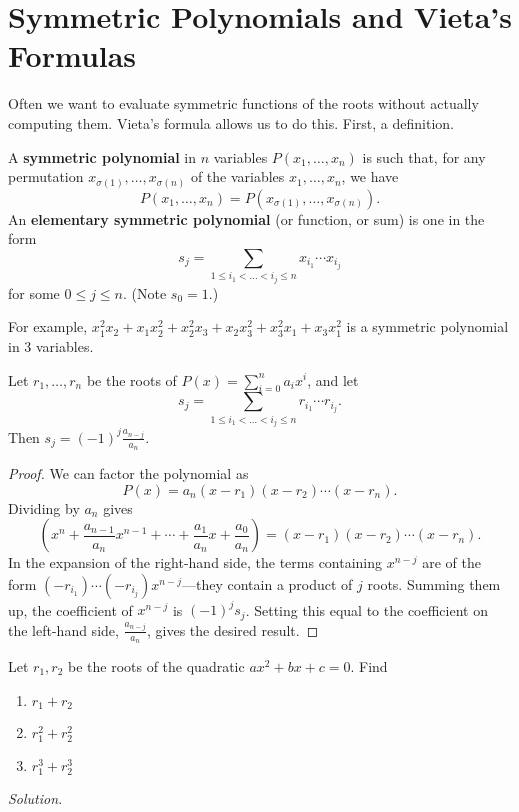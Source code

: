 \section{Symmetric Polynomials and Vieta's Formulas}
Often we want to evaluate symmetric functions of the roots without actually computing them. Vieta's formula allows us to do this. First, a definition.
\begin{df}
A \textbf{symmetric polynomial} in $n$ variables $P(x_1,\ldots, x_n)$ is such that, for any permutation $x_{\sigma(1)},\ldots, x_{\sigma(n)}$ of the variables $x_1,\ldots, x_n$, we have
\[P(x_1,\ldots, x_n)=P(x_{\sigma(1)},\ldots, x_{\sigma(n)}).\]
An \textbf{elementary symmetric polynomial} (or function, or sum) is one in the form
\[
s_j=\sum_{1\leq i_1<\ldots<i_j\leq n}x_{i_1}\cdots x_{i_j}
\]
for some $0\leq j\leq n$. (Note $s_0=1$.)
\end{df}
For example, $x_1^2x_2+x_1x_2^2+x_2^2x_3+x_2x_3^2+x_3^2x_1+x_3x_1^2$ is a symmetric polynomial in 3 variables.
\begin{thm}
Let $r_1,\ldots, r_n$ be the roots of $P(x)=\sum_{i=0}^n a_ix^i$, and let \[s_j=\sum_{1\leq i_1<\ldots<i_j\leq n}r_{i_1}\cdots r_{i_j}.\]  
Then $s_j=(-1)^j\frac{a_{n-j}}{a_n}$.
\end{thm}
\begin{proof}
We can factor the polynomial as
\[P(x)=a_n(x-r_1)(x-r_2)\cdots (x-r_n).\]
Dividing by $a_n$ gives
\[
\left(x^n+\frac{a_{n-1}}{a_n}x^{n-1}+\cdots +\frac{a_1}{a_n}x+\frac{a_0}{a_n}\right)=(x-r_1)(x-r_2)\cdots (x-r_n).
\]
In the expansion of the right-hand side, the terms containing $x^{n-j}$ are of the form $(-r_{i_1})\cdots (-r_{i_j})x^{n-j}$---they contain a product of $j$ roots. Summing them up, the coefficient of $x^{n-j}$ is $(-1)^js_j$. Setting this equal to the coefficient on the left-hand side, $\frac{a_{n-j}}{a_n}$, gives the desired result.
\end{proof}
\begin{ex}
Let $r_1,r_2$ be the roots of the quadratic $ax^2+bx+c=0$. Find
\begin{enumerate}
\item $r_1+r_2$
\item $r_1^2+r_2^2$
\item $r_1^3+r_2^3$
\end{enumerate}
\end{ex}
{\it Solution.}
